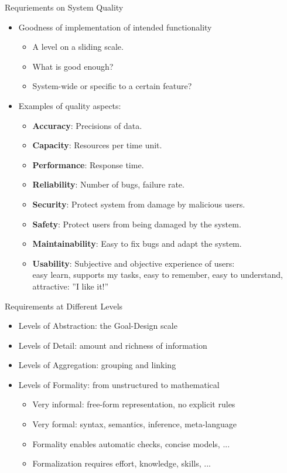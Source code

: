 \documentclass{beamer}
\begin{document}
\begin{frame}[fragile]{Requriements on System Quality}
\begin{itemize}
\item Goodness of implementation of intended functionality 
\begin{itemize}
  \item A level on a sliding scale.
  \item What is good enough?
  \item System-wide or specific to a certain feature?
\end{itemize}
\item Examples of quality aspects:
\begin{itemize}
\item \textbf{Accuracy}: Precisions of data.
\item \textbf{Capacity}: Resources per time unit.
\item \textbf{Performance}: Response time.
\item \textbf{Reliability}: Number of bugs, failure rate.
\item \textbf{Security}: Protect system from damage by malicious users. 
\item \textbf{Safety}: Protect users from being damaged by the system.
\item \textbf{Maintainability}: Easy to fix bugs and adapt the system.
\item \textbf{Usability}: Subjective and objective experience of users:\\ easy learn, supports my tasks, easy to remember, easy to understand, attractive: ''I like it!'' 
\end{itemize}
\end{itemize}
\end{frame}

\begin{frame}[fragile]{Requirements at Different Levels}
\begin{itemize}
\item Levels of Abstraction: the Goal-Design scale 
\item Levels of Detail: amount and richness of information 
\item Levels of Aggregation: grouping and linking 
\item Levels of Formality: from unstructured to mathematical
\begin{itemize}
\item Very informal: free-form representation, no explicit rules
\item Very formal: syntax, semantics, inference, meta-language
\item Formality enables automatic checks, concise models, ...
\item Formalization requires effort, knowledge, skills, ...
\end{itemize}
\end{itemize}
\end{frame}
\end{document}
